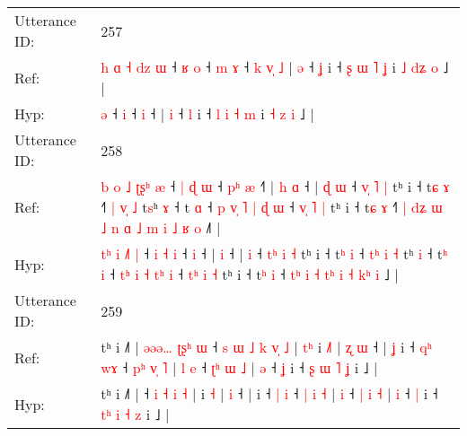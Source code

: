 \documentclass[10pt]{article}
\DeclareRobustCommand{\hl}[1]{{\textcolor{red}{#1}}}
\begin{document}
\begin{longtable}{ll}
 \\
\midrule
Utterance ID: & 257 \\
Ref: & \hl{h}\hl{ }\hl{ɑ}\hl{ }\hl{˧}\hl{ }\hl{d}\hl{z}\hl{ }\hl{ɯ} ˧\hl{ }\hl{ʁ} \hl{o} ˧\hl{ }\hl{m} \hl{ɤ} ˧\hl{ }\hl{k}\hl{ }\hl{v}\hl{̩}\hl{ }\hl{˩} | \hl{ə} ˧ \hl{ʝ} i ˧ \hl{ʂ} \hl{ɯ} \hl{˥} \hl{ʝ} i \hl{˩} \hl{d}\hl{ʑ} \hl{o} ˩ |
 \\
Hyp: & \hl{}\hl{}\hl{}\hl{}\hl{}\hl{}\hl{}\hl{}\hl{}\hl{ə} ˧\hl{}\hl{} \hl{i} ˧\hl{}\hl{} \hl{i} ˧\hl{}\hl{}\hl{}\hl{}\hl{}\hl{}\hl{} | \hl{i} ˧ \hl{l} i ˧ \hl{l} \hl{i} \hl{˧} \hl{m} i \hl{˧} \hl{}\hl{z} \hl{i} ˩ |
 \\
\midrule
Utterance ID: & 258 \\
Ref: & \hl{b}\hl{ }\hl{o} \hl{˩} \hl{ʈ}\hl{ʂ}\hl{ʰ} \hl{æ} ˧ \hl{|} \hl{ɖ} \hl{ɯ} ˧\hl{ }\hl{p}\hl{ʰ} \hl{æ} ˧\hl{˥} |\hl{ }\hl{h} \hl{ɑ} ˧ |\hl{ }\hl{ɖ} \hl{ɯ} ˧ \hl{v}\hl{̩} \hl{˥} \hl{|} tʰ i ˧ t\hl{ɕ} \hl{ɤ} ˧\hl{˥} \hl{|}\hl{ }\hl{v}\hl{̩} \hl{˩} t\hl{s}ʰ \hl{ɤ} ˧ t\hl{} \hl{ɑ} ˧ \hl{p}\hl{ }\hl{v}\hl{̩} \hl{˥} \hl{|}\hl{ }\hl{ɖ} \hl{ɯ} ˧ \hl{v}\hl{̩} \hl{˥} \hl{|} tʰ i ˧ t\hl{ɕ} \hl{ɤ} ˧\hl{˥}\hl{ }\hl{|} \hl{d}\hl{ʑ}\hl{ }\hl{ɯ} \hl{˩} \hl{n} \hl{ɑ}\hl{ }\hl{˩} \hl{m} \hl{i} \hl{˩}\hl{ }\hl{ʁ} \hl{o} ˩\hl{˥} |
 \\
Hyp: & \hl{}\hl{t}\hl{ʰ} \hl{i} \hl{}\hl{˩}\hl{˥} \hl{|} ˧ \hl{i} \hl{˧} \hl{i} ˧\hl{}\hl{}\hl{} \hl{i} ˧\hl{} |\hl{}\hl{} \hl{i} ˧ |\hl{}\hl{} \hl{i} ˧ \hl{t}\hl{ʰ} \hl{i} \hl{˧} tʰ i ˧ t\hl{ʰ} \hl{i} ˧\hl{} \hl{t}\hl{ʰ}\hl{ }\hl{i} \hl{˧} t\hl{}ʰ \hl{i} ˧ t\hl{ʰ} \hl{i} ˧ \hl{t}\hl{ʰ}\hl{ }\hl{i} \hl{˧} \hl{}\hl{t}\hl{ʰ} \hl{i} ˧ \hl{t}\hl{ʰ} \hl{i} \hl{˧} tʰ i ˧ t\hl{ʰ} \hl{i} ˧\hl{}\hl{}\hl{} \hl{}\hl{}\hl{t}\hl{ʰ} \hl{i} \hl{˧} \hl{}\hl{t}\hl{ʰ} \hl{i} \hl{˧} \hl{}\hl{k}\hl{ʰ} \hl{i} ˩\hl{} |
 \\
\midrule
Utterance ID: & 259 \\
Ref: & tʰ i ˩˥ |\hl{ }\hl{ə}\hl{ə}\hl{ə}\hl{…}\hl{ }\hl{ʈ}\hl{ʂ}\hl{ʰ}\hl{ }\hl{ɯ} ˧\hl{ }\hl{s}\hl{ }\hl{ɯ} \hl{˩} \hl{k} \hl{v}\hl{̩} \hl{˩} |\hl{ }\hl{t}\hl{ʰ} i \hl{˩}\hl{˥} |\hl{ }\hl{ʐ} \hl{ɯ} ˧ |\hl{ }\hl{ʝ} i ˧ \hl{q}\hl{ʰ} \hl{w}\hl{ɤ} ˧ \hl{p}\hl{ʰ} \hl{v}\hl{̩} \hl{˥} |\hl{ }\hl{l} \hl{e} ˧ \hl{ʈ}\hl{ʰ} \hl{ɯ} \hl{˩} | \hl{ə} ˧ \hl{ʝ} i ˧ \hl{}\hl{ʂ} \hl{ɯ} \hl{˥} \hl{ʝ} i ˩ |
 \\
Hyp: & tʰ i ˩˥ |\hl{}\hl{}\hl{}\hl{}\hl{}\hl{}\hl{}\hl{}\hl{}\hl{}\hl{} ˧\hl{}\hl{}\hl{}\hl{} \hl{i} \hl{˧} \hl{}\hl{i} \hl{˧} |\hl{}\hl{}\hl{} i \hl{}\hl{˧} |\hl{}\hl{} \hl{i} ˧ |\hl{}\hl{} i ˧ \hl{}\hl{|} \hl{}\hl{i} ˧ \hl{}\hl{|} \hl{}\hl{i} \hl{˧} |\hl{}\hl{} \hl{i} ˧ \hl{}\hl{|} \hl{i} \hl{˧} | \hl{i} ˧ \hl{|} i ˧ \hl{t}\hl{ʰ} \hl{i} \hl{˧} \hl{z} i ˩ |

\end{longtable}
\end{document}
